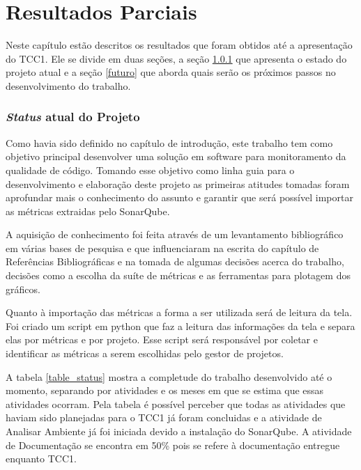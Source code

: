 \chapter[Resultados parciais]{Resultados Parciais}
\label{sec:resultados_parciais}
Neste capítulo estão descritos os resultados que foram obtidos até a apresentação do TCC1. Ele se divide em duas seções, a seção \ref{status} que apresenta o estado do projeto atual e a seção \ref{futuro} que aborda quais serão os próximos passos no desenvolvimento do trabalho.

\subsection{\textit{Status} atual do Projeto}
\label{status}

Como havia sido definido no capítulo de introdução, este trabalho tem como objetivo principal desenvolver uma solução em software para monitoramento da qualidade de código. Tomando esse objetivo como linha guia para o desenvolvimento e elaboração deste projeto as primeiras atitudes tomadas foram aprofundar mais o conhecimento do assunto e garantir que será possível importar as métricas extraidas pelo SonarQube.

A aquisição de conhecimento foi feita através de um levantamento bibliográfico em várias bases de pesquisa e que influenciaram na escrita do capítulo de Referências Bibliográficas e na tomada de algumas decisões acerca do trabalho, decisões como a escolha da suíte de métricas e as ferramentas para plotagem dos gráficos.

Quanto à importação das métricas a forma a ser utilizada será de leitura da tela. Foi criado um script em python que faz a leitura das informações da tela e separa elas por métricas e por projeto. Esse script será responsável por coletar e identificar as métricas a serem escolhidas pelo gestor de projetos. 

A tabela \ref{table_status} mostra a completude do trabalho desenvolvido até o momento, separando por atividades e os meses em que se estima que essas atividades ocorram. Pela tabela é possível perceber que todas as atividades que haviam sido planejadas para o TCC1 já foram concluidas e a atividade de Analisar Ambiente já foi iniciada devido a instalação do SonarQube. A atividade de Documentação se encontra em 50\% pois se refere à documentação entregue enquanto TCC1.

